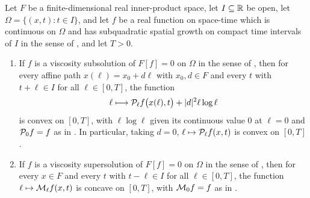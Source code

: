 \begin{lemma}
Let $F$ be a finite-dimensional real inner-product space, let $I\subseteq\mathbb{R}$ be
open, let $\Omega=\{(x,t):t\in I\}$, and let $f$ be a real function on space-time
which is continuous on $\Omega$ and has subquadratic spatial growth on compact
time intervals of $I$ in the sense of ,
and let $T>0$.
\begin{enumerate}
\item If $f$ is a viscosity subsolution of $F[f]=0$ on $\Omega$ in the sense of
, then for every affine path $x(\ell)=x_0+d\ell$ with
$x_0,d\in F$ and every $t$ with $t+\ell\in I$ for all $\ell\in[0,T]$, the
function
\begin{equation}\label{eq:path-envelope-convexity}
  \ell\longmapsto\mathcal{P}_\ell f\bigl(x(\ell),t\bigr)+|d|^2\ell\log\ell
\end{equation}
is convex on $[0,T]$, with $\ell\log\ell$ given its continuous value $0$ at
$\ell=0$ and $\mathcal{P}_0f=f$ as in . In particular, taking
$d=0$, $\ell\mapsto\mathcal{P}_\ell f(x,t)$ is convex on $[0,T]$.
\item If $f$ is a viscosity supersolution of $F[f]=0$ on $\Omega$ in the sense of
, then for every $x\in F$ and every $t$ with
$t-\ell\in I$ for all $\ell\in[0,T]$, the function
$\ell\mapsto\mathcal{M}_\ell f(x,t)$ is concave on $[0,T]$, with $\mathcal{M}_0f=f$ as in
.
\end{enumerate}
\end{lemma}
